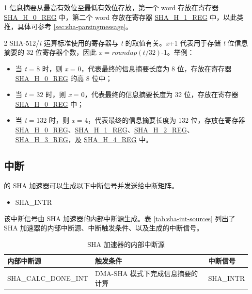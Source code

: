 \documentclass[main\_\_CN.tex]{subfiles}
\begin{document}
\begin{table}[H]
\begin{threeparttable}
    \begin{tablenotes}
        \item[1] 信息摘要从最高有效位至最低有效位存放，第一个 word 存放在寄存器 \hyperref[regdesc:SHAHNREG]{SHA\_H\_0\_REG} 中，第二个 word 存放在寄存器 \hyperref[regdesc:SHAHNREG]{SHA\_H\_1\_REG} 中，以此类推，具体可参考 \ref{sec:sha-parsingmessage}。
        \item[2] SHA-512/{\it{t}} 运算标准使用的寄存器与 {\it{t}} 的取值有关。{\it{x}}+1 代表用于存储 {\it{t}} 位信息摘要的 32 位寄存器个数，因此 {\it{x}} = \begin{math}roundup(t/32)\end{math}-1。举例：
        \begin{itemize}
            \item 当 {\it{t}} = 8 时，则 {\it{x}} = 0，代表最终的信息摘要长度为 8 位，存放在寄存器 \hyperref[regdesc:SHAHNREG]{SHA\_H\_0\_REG} 的高 8 位中；
            \item 当 {\it{t}} = 32 时，则 {\it{x}} = 0，代表最终的信息摘要长度为 32 位，存放在寄存器 \hyperref[regdesc:SHAHNREG]{SHA\_H\_0\_REG} 中；
            \item 当 {\it{t}} = 132 时，则 {\it{x}} = 4，代表最终的信息摘要长度为 132 位，存放在寄存器 \hyperref[regdesc:SHAHNREG]{SHA\_H\_0\_REG}、\hyperref[regdesc:SHAHNREG]{SHA\_H\_1\_REG}、\hyperref[regdesc:SHAHNREG]{SHA\_H\_2\_REG}、\hyperref[regdesc:SHAHNREG]{SHA\_H\_3\_REG}，及 \hyperref[regdesc:SHAHNREG]{SHA\_H\_4\_REG} 中。
        \end{itemize}
    \end{tablenotes}

    \end{threeparttable}
\end{table}


\subsection{中断}\label{sec:sha-Interrupt}
\chipname{} 的 SHA 加速器可以生成以下中断信号并发送给\hyperref[mod:intmtrx]{中断矩阵}。

    \begin{itemize}
        \item SHA\_INTR
    \end{itemize}

该中断信号由 SHA 加速器的内部中断源生成。表 \ref{tab:sha-int-sources} 列出了 SHA 加速器的内部中断源、中断触发条件、以及生成的中断信号。

\begin{longtable}{ | L{5cm} | L{6.5cm} | L{4cm} | }
\caption{SHA 加速器的内部中断源} \label{tab:sha-int-sources}
\\ \hline
{}
\textbf{内部中断源} & \textbf{触发条件}  &  \textbf{中断信号}\\ \hline
\label{int:SHACALCDONEINT}SHA\_CALC\_DONE\_INT  &  DMA-SHA 模式下完成信息摘要的计算 &  SHA\_INTR  \\ \hline
\end{longtable}
\end{document}
